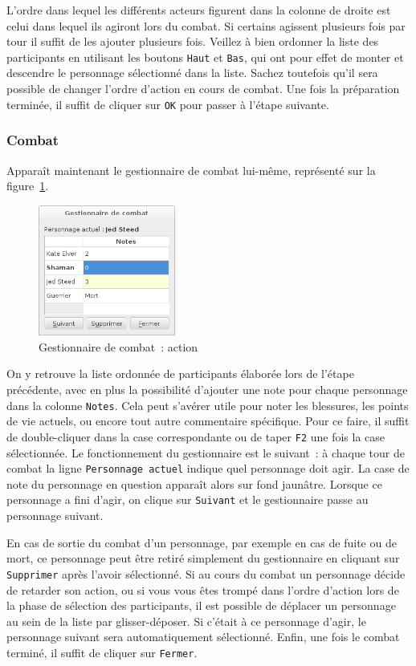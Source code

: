 \documentclass[a4paper,12pt]{article}
\newcommand*{\interfaceitem}[1]{\texttt{#1}}
\begin{document}
L'ordre dans lequel les différents acteurs figurent dans la colonne de droite est celui dans lequel ils agiront lors du combat.
Si certains agissent plusieurs fois par tour il suffit de les ajouter plusieurs fois.
Veillez à bien ordonner la liste des participants en utilisant les boutons \interfaceitem{Haut} et \interfaceitem{Bas}, qui ont pour effet de monter et descendre le personnage sélectionné dans la liste.
Sachez toutefois qu'il sera possible de changer l'ordre d'action en cours de combat.
Une fois la préparation terminée, il suffit de cliquer sur \interfaceitem{OK} pour passer à l'étape suivante.

\subsubsection{Combat}

Apparaît maintenant le gestionnaire de combat lui-même, représenté sur la figure~\ref{gestion_combat_fight}.
\begin{figure}[h]
    \includegraphics[width=0.4\textwidth]{gestion_combat_fight}
    \caption{Gestionnaire de combat~: action}
    \label{gestion_combat_fight}
\end{figure}
On y retrouve la liste ordonnée de participants élaborée lors de l'étape précédente, avec en plus la possibilité d'ajouter une note pour chaque personnage dans la colonne \interfaceitem{Notes}.
Cela peut s'avérer utile pour noter les blessures, les points de vie actuels, ou encore tout autre commentaire spécifique.
Pour ce faire, il suffit de double-cliquer dans la case correspondante ou de taper \interfaceitem{F2} une fois la case sélectionnée.
Le fonctionnement du gestionnaire est le suivant~: à chaque tour de combat la ligne \interfaceitem{Personnage actuel} indique quel personnage doit agir.
La case de note du personnage en question apparaît alors sur fond jaunâtre.
Lorsque ce personnage a fini d'agir, on clique sur \interfaceitem{Suivant} et le gestionnaire passe au personnage suivant.

En cas de sortie du combat d'un personnage, par exemple en cas de fuite ou de mort, ce personnage peut être retiré simplement du gestionnaire en cliquant sur \interfaceitem{Supprimer} après l'avoir sélectionné.
Si au cours du combat un personnage décide de retarder son action, ou si vous vous êtes trompé dans l'ordre d'action lors de la phase de sélection des participants, il est possible de déplacer un personnage au sein de la liste par glisser-déposer.
Si c'était à ce personnage d'agir, le personnage suivant sera automatiquement sélectionné.
Enfin, une fois le combat terminé, il suffit de cliquer sur \interfaceitem{Fermer}.
\end{document}
